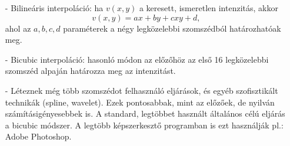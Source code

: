 \documentclass[12pt]{article}
\theoremstyle{plain}
\begin{document}
\begin{itemize}
\begin{itemize}
\item[-] Bilineáris interpoláció: ha $v(x,y)$ a keresett, ismeretlen intenzitás, akkor
$$v(x,y) = ax +by +cxy +d, $$
ahol az $a,b,c,d$ paraméterek a négy legközelebbi szomszédból határozhatóak meg.

\item[-] Bicubic interpoláció: hasonló módon az előzőhöz az első 16 legközelebbi szomszéd alpaján határozza meg az intenzitást. 

\item[-] Léteznek még több szomszédot felhasználó eljárások, és egyéb szofisztikált technikák (spline, wavelet). Ezek pontosabbak, mint az előzőek, de nyilván számításigényesebbek is. A standard, legtöbbet használt általános célú eljárás a bicubic módszer. A legtöbb képszerkesztő programban is ezt használják pl.: Adobe Photoshop.
\end{itemize}
\end{itemize}{}
\end{document}
